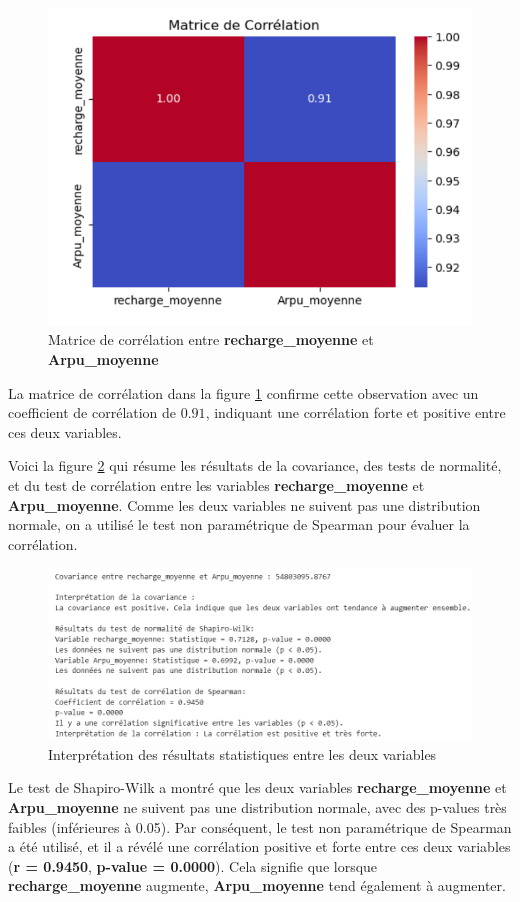 \begin{figure}[H]
    \centering
    \includegraphics[width=0.5\linewidth]{capture_sas_48.png}
    \caption{Matrice de corrélation entre \textbf{recharge\_moyenne} et \textbf{Arpu\_moyenne}}
    \label{matrice1}
\end{figure}

\noindent
La matrice de corrélation dans la figure \ref{matrice1} confirme cette observation avec un coefficient de corrélation de \(0.91\), indiquant une corrélation forte et positive entre ces deux variables.\par

Voici la figure \ref{11} qui résume les résultats de la covariance, des tests de normalité, et du test de corrélation entre les variables \textbf{recharge\_moyenne} et \textbf{Arpu\_moyenne}. Comme les deux variables ne suivent pas une distribution normale, on a utilisé le test non paramétrique de Spearman pour évaluer la corrélation.

\begin{figure}[H]
    \centering
    \includegraphics[width=0.8\linewidth]{capture_sas_49.png}
    \caption{Interprétation des résultats statistiques entre les deux variables}
    \label{11}
\end{figure}

\noindent
Le test de Shapiro-Wilk a montré que les deux variables \textbf{recharge\_moyenne} et \textbf{Arpu\_moyenne} ne suivent pas une distribution normale, avec des p-values très faibles (inférieures à 0.05). Par conséquent, le test non paramétrique de Spearman a été utilisé, et il a révélé une corrélation positive et forte entre ces deux variables (\textbf{r = 0.9450}, \textbf{p-value = 0.0000}). Cela signifie que lorsque \textbf{recharge\_moyenne} augmente, \textbf{Arpu\_moyenne} tend également à augmenter.

